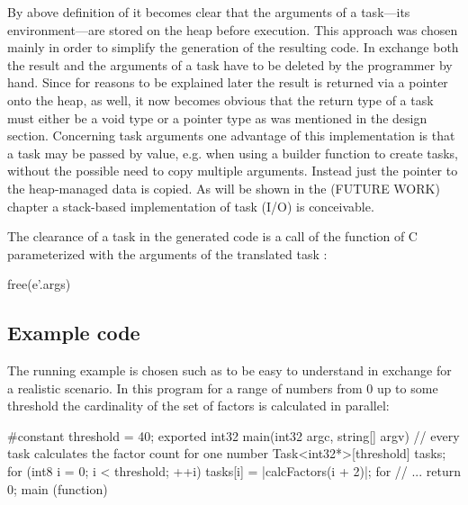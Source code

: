 By above definition of  it becomes clear that the arguments of a task---its environment---are stored on the heap before execution. This approach was chosen mainly in order to simplify the generation of the resulting code. In exchange both the result and the arguments of a task have to be deleted by the programmer by hand. Since for reasons to be explained later the result is returned via a pointer onto the heap, as well, it now becomes obvious that the return type of a task must either be a void type or a pointer type as was mentioned in the design section. Concerning task arguments one advantage of this implementation is that a task may be passed by value, e.g. when using a builder function to create tasks, without the possible need to copy multiple arguments. Instead just the pointer to the heap-managed data is copied. As will be shown in the (FUTURE WORK) chapter a stack-based implementation of task (I/O) is conceivable. 

The clearance of a task  in the generated code is a call of the  function of C parameterized with the arguments of the translated task :
\begin{ccode}
free(e'.args)
\end{ccode}

\subsection{Example code}
The running example is chosen such as to be easy to understand in exchange for a realistic scenario. In this program for a range of numbers from 0 up to some threshold the cardinality of the set of factors is calculated in parallel:

\begin{ccode}
#constant threshold = 40; 
exported int32 main(int32 argc, string[] argv) { 
  // every task calculates the factor count for one number
  Task<int32*>[threshold] tasks; 
  for (int8 i = 0; i < threshold; ++i) { 
    tasks[i] = |calcFactors(i + 2)|; 
  } for 
  // ...
  return 0; 
} main (function)

\end{ccode}

